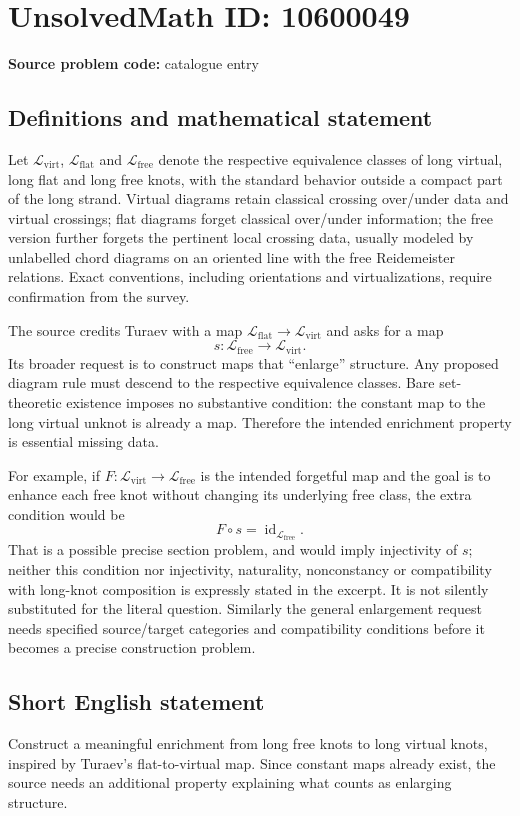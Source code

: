 \documentclass[11pt]{article}
\begin{document}
\section*{UnsolvedMath ID: 10600049}
\textbf{Source problem code:} catalogue entry
\subsection{Definitions and mathematical statement}
Let \(\mathcal L_{\mathrm{virt}}\), \(\mathcal L_{\mathrm{flat}}\) and \(\mathcal L_{\mathrm{free}}\) denote the respective equivalence classes of long virtual, long flat and long free knots, with the standard behavior outside a compact part of the long strand. Virtual diagrams retain classical crossing over/under data and virtual crossings; flat diagrams forget classical over/under information; the free version further forgets the pertinent local crossing data, usually modeled by unlabelled chord diagrams on an oriented line with the free Reidemeister relations. Exact conventions, including orientations and virtualizations, require confirmation from the survey.

The source credits Turaev with a map \(\mathcal L_{\mathrm{flat}}\to\mathcal L_{\mathrm{virt}}\) and asks for a map
\[s:\mathcal L_{\mathrm{free}}\longrightarrow\mathcal L_{\mathrm{virt}}.\]
Its broader request is to construct maps that ``enlarge'' structure. Any proposed diagram rule must descend to the respective equivalence classes. Bare set-theoretic existence imposes no substantive condition: the constant map to the long virtual unknot is already a map. Therefore the intended enrichment property is essential missing data.

For example, if \(F:\mathcal L_{\mathrm{virt}}\to\mathcal L_{\mathrm{free}}\) is the intended forgetful map and the goal is to enhance each free knot without changing its underlying free class, the extra condition would be
\[F\circ s=\operatorname{id}_{\mathcal L_{\mathrm{free}}}.\]
That is a possible precise section problem, and would imply injectivity of \(s\); neither this condition nor injectivity, naturality, nonconstancy or compatibility with long-knot composition is expressly stated in the excerpt. It is not silently substituted for the literal question. Similarly the general enlargement request needs specified source/target categories and compatibility conditions before it becomes a precise construction problem.
\subsection{Short English statement}
Construct a meaningful enrichment from long free knots to long virtual knots, inspired by Turaev's flat-to-virtual map. Since constant maps already exist, the source needs an additional property explaining what counts as enlarging structure.
\end{document}

